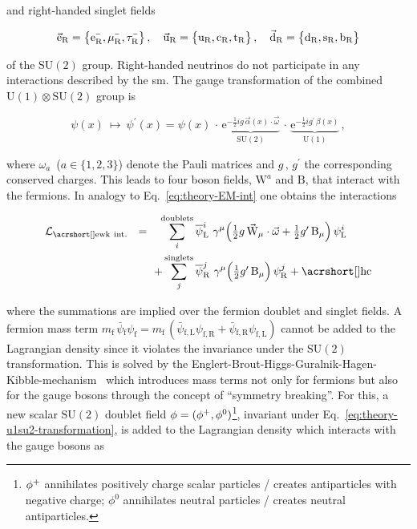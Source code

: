and right-handed singlet fields

\begin{align}
\vec{\mathrm{e}}_\mathrm{R}=\big\{\mathrm{e}^{\rmminus}_\mathrm{R},\mu^{\rmminus}_\mathrm{R},\tau^{\rmminus}_\mathrm{R}\big\}\,,\quad\vec{\mathrm{u}}_\mathrm{R}=\big\{\mathrm{u}_\mathrm{R},\mathrm{c}_\mathrm{R},\mathrm{t}_\mathrm{R}\big\}\,,\quad\vec{\mathrm{d}}_\mathrm{R}=\big\{\mathrm{d}_\mathrm{R},\mathrm{s}_\mathrm{R},\mathrm{b}_\mathrm{R}\big\} \label{eq:theory-su2-singlets}
\end{align}

of the $\mathrm{SU(2)}$ group. Right-handed neutrinos do not participate in any interactions described by the \gls{sm}. The gauge transformation of the combined $\mathrm{U(1)}\otimes \mathrm{SU(2)}$ group is

\begin{equation}
\psi(x)~\mapsto~\psi^\prime(x)=\psi(x)\,\cdot\,\underbrace{\mathrm{e}^{-\tfrac{1}{2}ig\,\vec{\alpha}(x)\cdot\vec{\omega}}}_\mathrm{SU(2)}\,\cdot\,\underbrace{\mathrm{e}^{-\tfrac{1}{2}ig^{\prime}\,\beta(x)}}_\mathrm{U(1)}\,, \label{eq:theory-u1su2-transformation}
\end{equation}

where $\omega_{a}$~($a\in\{1,2,3\}$) denote the Pauli matrices and $g$\,, $g^{\prime}$ the corresponding conserved charges. This leads to four boson fields, $\mathrm{W}^{a}$ and $\mathrm{B}$, that interact with the fermions. In analogy to Eq.~\ref{eq:theory-EM-int} one obtains the  interactions

\begin{align}
\mathcal{L}_\mathrm{\gls{ewk}~ int.}~~=\hphantom{+}\sum_{i}^\mathrm{doublets}\,&\bar{\psi}^{i}_\mathrm{L}~\gamma^{\mu}\Big(\tfrac{1}{2}g\,\vec{\mathrm{W}}_{\mu}\cdot\vec{\omega}+\tfrac{1}{2}g^{\prime}\,\mathrm{B}_{\mu}\Big)\,\psi^{i}_\mathrm{L} \nonumber\\
+\sum_{j}^\mathrm{singlets}\,&\bar{\psi}^{j}_\mathrm{R}~\gamma^{\mu}\Big(\tfrac{1}{2}g^{\prime}\,\mathrm{B}_{\mu}\Big)\,\psi^{j}_\mathrm{R} + \mathrm{\gls{hc}} \label{eq:theory-codev-su2-interaction}
\end{align}

where the summations are implied over the fermion doublet and singlet fields. A fermion mass term $ m_\mathrm{f}\,\bar{\psi}{}_\mathrm{f}\psi_\mathrm{f}=m_\mathrm{f}\,(\bar{\psi}{}_\mathrm{f,L}\psi_\mathrm{f,R}+\bar{\psi}{}_\mathrm{f,R}\psi_\mathrm{f,L})$ cannot be added to the Lagrangian density since it violates the invariance under the $\mathrm{SU(2)}$ transformation. This is solved by the Englert-Brout-Higgs-Guralnik-Hagen-Kibble-mechanism~\cite{HIGGS1964132,PhysRevLett.13.508,PhysRevLett.13.321,PhysRevLett.13.585} which introduces mass terms not only for fermions but also for the gauge bosons through the concept of ``symmetry breaking''. For this, a new scalar $\mathrm{SU(2)}$ doublet field $\phi=(\phi^{+},\phi^{0})$\footnote{$\phi^{+}$ annihilates positively charge scalar particles / creates antiparticles with negative charge; $\phi^{0}$ annihilates neutral particles / creates neutral antiparticles.}, invariant under Eq.~\ref{eq:theory-u1su2-transformation}, is added to the Lagrangian density which interacts with the gauge bosons as

